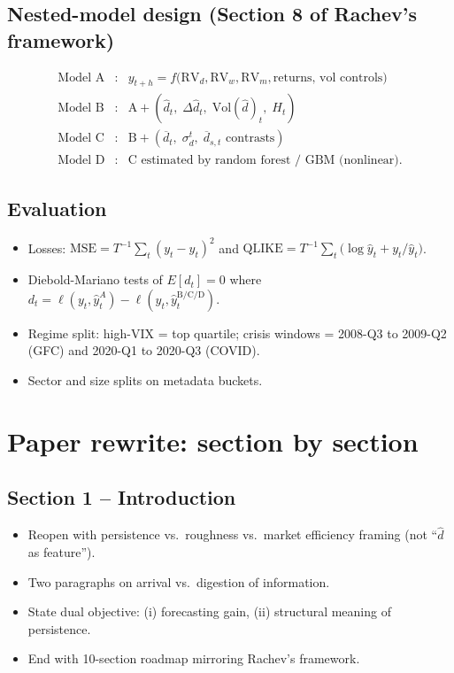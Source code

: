 \documentclass[11pt,a4paper]{article}
\begin{document}
\subsection{Nested-model design (Section 8 of Rachev's framework)}
\[
\begin{array}{lll}
\text{Model A} & : & y_{t+h}=f\bigl(\mathrm{RV}_d,\mathrm{RV}_w,
\mathrm{RV}_m,\text{returns, vol controls}\bigr) \\
\text{Model B} & : & \text{A} + (\hat d_t,\;\Delta\hat d_t,\;
\mathrm{Vol}(\hat d)_t,\;H_t) \\
\text{Model C} & : & \text{B} + (\overline{d}_t,\;\sigma_d^t,\;
\overline{d}_{s,t}\text{ contrasts}) \\
\text{Model D} & : & \text{C estimated by random forest / GBM (nonlinear)}.
\end{array}
\]

\subsection{Evaluation}
\begin{itemize}
  \item Losses: $\mathrm{MSE}=T^{-1}\sum_t(y_t-\hat y_t)^2$ and
  $\mathrm{QLIKE}=T^{-1}\sum_t\bigl(\log\hat y_t+y_t/\hat y_t\bigr)$.
  \item Diebold-Mariano tests of $E[d_t]=0$ where
  $d_t=\ell(y_t,\hat y_t^{A})-\ell(y_t,\hat y_t^{\text{B/C/D}})$.
  \item Regime split: high-VIX = top quartile; crisis windows = 2008-Q3
  to 2009-Q2 (GFC) and 2020-Q1 to 2020-Q3 (COVID).
  \item Sector and size splits on metadata buckets.
\end{itemize}

\section{Paper rewrite: section by section}

\subsection{Section 1 -- Introduction}
\begin{itemize}
  \item Reopen with persistence vs.\ roughness vs.\ market efficiency
  framing (not ``$\hat d$ as feature'').
  \item Two paragraphs on arrival vs.\ digestion of information.
  \item State dual objective: (i) forecasting gain, (ii) structural meaning
  of persistence.
  \item End with 10-section roadmap mirroring Rachev's framework.
\end{itemize}
\end{document}
